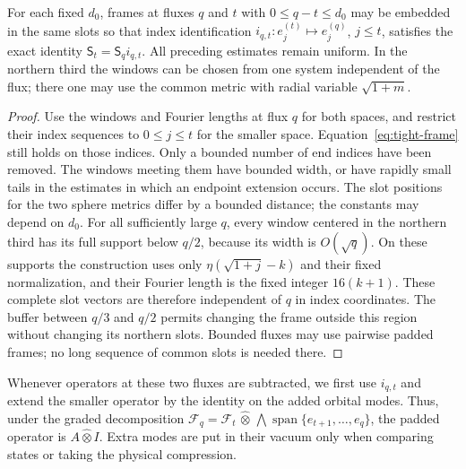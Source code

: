 \begin{lemma}\label{locality:common-frames}
For each fixed $d_0$, frames at fluxes $q$ and $t$ with
$0\leq q-t\leq d_0$ may be embedded in the same slots so that index
identification $i_{q,t}:e_j^{(t)}\mapsto e_j^{(q)}$, $j\leq t$,
satisfies the exact identity $\mathsf S_t=\mathsf S_q i_{q,t}$.
All preceding estimates remain uniform.  In the northern third the
windows can be chosen from one system independent of the flux; there
one may use the common metric with radial variable $\sqrt{1+m}$.
\end{lemma}

\begin{proof}
Use the windows and Fourier lengths at flux $q$ for both spaces, and
restrict their index sequences to $0\leq j\leq t$ for the smaller
space.  Equation~\eqref{eq:tight-frame} still holds on those indices.
Only a bounded number of end indices have been removed.  The windows
meeting them have bounded width, or have rapidly small tails in the
estimates in which an endpoint extension occurs.  The slot positions
for the two sphere metrics differ by a bounded distance; the constants
may depend on $d_0$.  For all sufficiently large $q$, every window
centered in the northern third has its full support below $q/2$,
because its width is $O(\sqrt q)$.  On these supports the construction
uses only $\eta(\sqrt{1+j}-k)$ and their fixed normalization, and
their Fourier length is the fixed integer $16(k+1)$.  These complete
slot vectors are therefore independent of $q$ in index coordinates.
The buffer between $q/3$ and $q/2$ permits changing the frame outside
this region without changing its northern slots.  Bounded fluxes may
use pairwise padded frames; no long sequence of common slots is needed
there.
\end{proof}

Whenever operators at these two fluxes are subtracted, we first use
$i_{q,t}$ and extend the smaller operator by the identity on the
added orbital modes.  Thus, under the graded decomposition
$\mathcal F_q=\mathcal F_t\,\widehat\otimes\,
\bigwedge\operatorname{span}\{e_{t+1},\ldots,e_q\}$, the padded
operator is $A\widehat\otimes I$.  Extra modes are put in their
vacuum only when comparing states or taking the physical compression.

